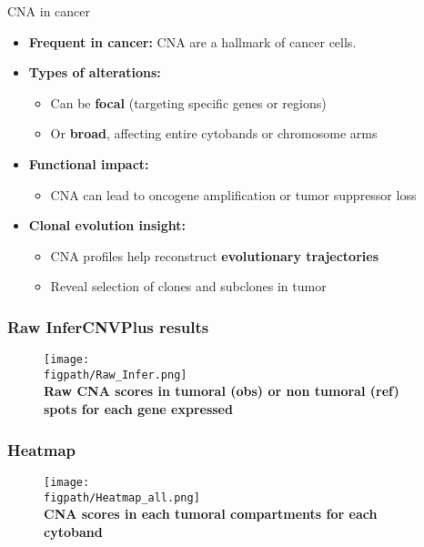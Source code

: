 \documentclass[aspectratio=169]{beamer}
\newcommand{\figpath}{/mnt/datadisk/Jordan/Delivrables/Rapports/Rapport_stage/Figures/Sans_légendes}
\begin{document}
\begin{frame}{CNA in cancer}
    \begin{itemize}
        \item \textbf{Frequent in cancer:} CNA are a hallmark of cancer cells.
        \vspace{0.5em}
        
        \item \textbf{Types of alterations:}
        \begin{itemize}
            \item Can be \textbf{focal} (targeting specific genes or regions)
            \item Or \textbf{broad}, affecting entire cytobands or chromosome arms
        \end{itemize}
        \vspace{0.5em}
        
        \item \textbf{Functional impact:} 
        \begin{itemize}
            \item CNA can lead to oncogene amplification or tumor suppressor loss
        \end{itemize}
        \vspace{0.5em}

        \item \textbf{Clonal evolution insight:}
        \begin{itemize}
            \item CNA profiles help reconstruct \textbf{evolutionary trajectories}
            \item Reveal selection of clones and subclones in tumor
        \end{itemize}
    \end{itemize}
\end{frame}

\begin{frame}
	\frametitle<presentation>{Raw InferCNVPlus results}
	\begin{figure}
		\centering
			\texttt{[image: \\figpath/Raw\_Infer.png]}\\
            \centering
            \textbf{Raw CNA scores in tumoral (obs) or non tumoral (ref) spots for each gene expressed}
		\label{fig:heatmap1}
	\end{figure}
\end{frame}

\begin{frame}
	\frametitle<presentation>{Heatmap}
	\begin{figure}
		\centering
			\texttt{[image: \\figpath/Heatmap\_all.png]}\\
            \centering
            \textbf{CNA scores in each tumoral compartments for each cytoband}
		\label{fig:heatmap2}
	\end{figure}
\end{frame}
\end{document}
